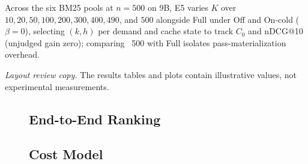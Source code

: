 Across the six BM25 pools at $n{=}500$ on 9B, E5 varies $K$ over $10, 20, 50, 100, 200, 300, 400, 490$, and $500$ alongside Full under Off and On-cold ($\beta{=}0$), selecting $(k,h)$ per demand and cache state to track $C_0$ and nDCG@10 (unjudged gain zero); comparing \LIMIT~500 with Full isolates pass-materialization overhead.

\noindent\textit{Layout review copy.} The results tables and plots contain illustrative values, not experimental measurements.
\FloatBarrier
\begin{figure}[p]
  \begingroup
  \renewenvironment{table*}[1][]{%
    \noindent\begin{minipage}{\textwidth}\captionsetup{type=table}\centering
  }{\end{minipage}\par\vskip1pt}%
  \renewenvironment{figure*}[1][]{%
    \noindent\begin{minipage}{\textwidth}\captionsetup{type=figure}\centering
  }{\end{minipage}\par\vskip1pt}%
\subsection{End-to-End Ranking}
\label{sec:exp:e1}



\subsection{Cost Model}
\label{sec:exp:e2}
{\graphicspath{{fig/experiments/fig06-cost-model/}}%
}

  \endgroup
\end{figure}
\twocolumn[{%
\begin{minipage}{\textwidth}
  \begingroup
  \renewenvironment{figure*}[1][]{\par\centering\captionsetup{type=figure}}{\par}%
  \subsection{Large-Scale Ranking}
  \label{sec:exp:scale}
  
  \endgroup
\end{minipage}\par\vspace{4pt}%
}]
\begingroup
\placeexperimentfigures

